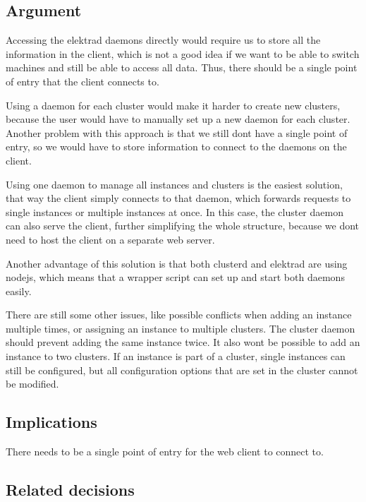 \subsection*{Argument}

Accessing the elektrad daemons directly would require us to store all the information in the client, which is not a good idea if we want to be able to switch machines and still be able to access all data. Thus, there should be a single point of entry that the client connects to.

Using a daemon for each cluster would make it harder to create new clusters, because the user would have to manually set up a new daemon for each cluster. Another problem with this approach is that we still don\textquotesingle{}t have a single point of entry, so we would have to store information to connect to the daemons on the client.

Using one daemon to manage all instances and clusters is the easiest solution, that way the client simply connects to that daemon, which forwards requests to single instances or multiple instances at once. In this case, the cluster daemon can also serve the client, further simplifying the whole structure, because we don\textquotesingle{}t need to host the client on a separate web server.

Another advantage of this solution is that both clusterd and elektrad are using nodejs, which means that a wrapper script can set up and start both daemons easily.

There are still some other issues, like possible conflicts when adding an instance multiple times, or assigning an instance to multiple clusters. The cluster daemon should prevent adding the same instance twice. It also won\textquotesingle{}t be possible to add an instance to two clusters. If an instance is part of a cluster, single instances can still be configured, but all configuration options that are set in the cluster cannot be modified.

\subsection*{Implications}


\begin{DoxyItemize}
\item There needs to be a single point of entry for the web client to connect to.
\end{DoxyItemize}

\subsection*{Related decisions}


